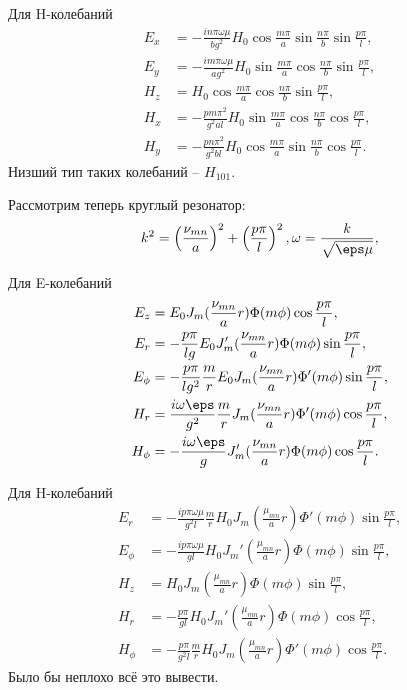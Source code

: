 Для H-колебаний
\begin{align*}
	E_x & = -\frac{in\pi\omega\mu}{b g^2}H_0\cos\frac{m\pi}{a}\sin\frac{n\pi}{b}\sin\frac{p\pi}{l},\\
	E_y & = -\frac{im\pi\omega\mu}{a g^2}H_0\sin\frac{m\pi}{a}\cos\frac{n\pi}{b}\sin\frac{p\pi}{l},\\
	H_z & = H_0\cos\frac{m\pi}{a}\cos\frac{n\pi}{b}\sin\frac{p\pi}{l},\\
	H_x & = -\frac{pm\pi^2}{g^2 al}H_0\sin\frac{m\pi}{a}\cos\frac{n\pi}{b}\cos\frac{p\pi}{l},\\
	H_y & = -\frac{pn\pi^2}{g^2 bl}H_0\cos\frac{m\pi}{a}\sin\frac{n\pi}{b}\cos\frac{p\pi}{l}.
\end{align*}
Низший тип таких колебаний -- \(H_{101}\).

Рассмотрим теперь круглый резонатор:
\[
	k^2 = \left(\frac{\nu_{mn}}{a}\right)^2+
					 \left(\frac{p\pi}{l}\right)^2,
	\omega = \frac{k}{\sqrt{\eps\mu}},
\]

Для E-колебаний
\begin{align*}
	E_z & = E_0 J_m(\frac{\nu_{mn}}{a}r)\Phi(m\phi)\cos\frac{p\pi}{l},\\
	E_r & = -\frac{p\pi}{lg}E_0 J_m'(\frac{\nu_{mn}}{a}r)\Phi(m\phi)\sin\frac{p\pi}{l},\\
	E_\phi & = -\frac{p\pi}{l g^2}\frac{m}{r}E_0 J_m(\frac{\nu_{mn}}{a}r)\Phi'(m\phi)\sin\frac{p\pi}{l},\\
	H_r & = \frac{i\omega\eps}{g^2}\frac{m}{r}J_m(\frac{\nu_{mn}}{a}r)\Phi'(m\phi)\cos\frac{p\pi}{l},\\
	H_\phi & = -\frac{i\omega\eps}{g}J_m'(\frac{\nu_{mn}}{a}r)\Phi(m\phi)\cos\frac{p\pi}{l}.
\end{align*}

Для H-колебаний
\begin{align*}
	E_r & = -\frac{ip\pi\omega\mu}{g^2 l}\frac{m}{r}H_0J_m(\frac{\mu_{mn}}{a}r)\Phi'(m\phi)\sin\frac{p\pi}{l},\\
	E_\phi & = -\frac{ip\pi\omega\mu}{g l}H_0J_m'(\frac{\mu_{mn}}{a}r)\Phi(m\phi)\sin\frac{p\pi}{l},\\
	H_z & = H_0 J_m(\frac{\mu_{mn}}{a}r)\Phi(m\phi)\sin\frac{p\pi}{l},\\
	H_r & = -\frac{p\pi}{gl}H_0 J_m'(\frac{\mu_{mn}}{a}r)\Phi(m\phi)\cos\frac{p\pi}{l},\\
	H_\phi & = -\frac{p\pi}{g^2l}\frac{m}{r}H_0 J_m(\frac{\mu_{mn}}{a}r)\Phi'(m\phi)\cos\frac{p\pi}{l}.
\end{align*}
Было бы неплохо всё это вывести.

